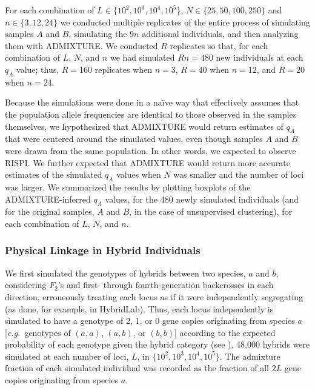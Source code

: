 For each combination of $L \in \{10^2, 10^3, 10^4, 10^5\}$,
$N \in \{25, 50, 100, 250\}$ and $n\in\{3,12,24\}$ we conducted multiple replicates
of the entire process of
simulating samples $A$ and $B$, simulating the $9n$ additional individuals, and
then analyzing them with ADMIXTURE.  We conducted $R$ replicates so that,
for each combination of $L$, $N$, and $n$ we had simulated $Rn=480$ new individuals
at each $q_A$ value; thus, $R=160$ replicates when $n = 3$, $R=40$ when $n=12$, and
$R=20$ when $n=24$.


Because the simulations were done in a na\"{i}ve way that effectively assumes that the population
allele frequencies are identical to those observed in the samples themselves, we hypothesized that ADMIXTURE would return estimates of
$q_A$ that were
centered around the simulated values, even though samples $A$ and $B$ were drawn from the same
population. In other words, we expected to observe RISPI.
We further expected that ADMIXTURE would return more accurate estimates of the simulated
$q_A$ values when $N$ was smaller and the number of loci was larger.
We summarized the results by plotting boxplots of the ADMIXTURE-inferred $q_A$ values,
 for the 480 newly simulated individuals (and for the original samples, $A$ and $B$, in the
 case of unsupervised clustering),
for each combination of $L$, $N$, and $n$.




\subsubsection*{Physical Linkage in Hybrid Individuals}

We first simulated the genotypes of hybrids between two species, $a$ and $b$,
considering $F_2$'s and first- through
fourth-generation backcrosses in each direction, erroneously treating each
locus as if it were independently segregating (as done, for example, in {\sc HybridLab}). Thus,
each locus independently is simulated to have a genotype of 2, 1, or 0 gene copies originating from species $a$ [{\em e.g.}~genotypes of $(a,a)$, $(a,b)$, or $(b,b)$] according to the expected
probability of each genotype given the hybrid category (see \citealt{anderson2002model}).
48,000 hybrids were simulated at each number of loci, $L$, in $\{10^2, 10^3, 10^4, 10^5\}$.
The admixture fraction of each simulated individual was recorded as the fraction of all $2L$
gene copies originating from species $a$.  

